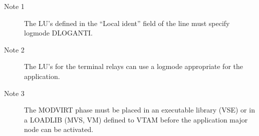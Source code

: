 \documentclass[letterpaper,10pt,english]{sphinxmanual}
\begin{document}
\begin{sphinxVerbatim}[commandchars=\\\{\}]
           
  
  
  
  
  
\end{sphinxVerbatim}

\begin{description}
\item[{Note 1}] \leavevmode
The LU’s defined in the “Local ident” field of the line must specify logmode DLOGANTI.

\item[{Note 2}] \leavevmode
The LU’s for the terminal relays can use a logmode appropriate for the application.

\item[{Note 3}] \leavevmode
The MODVIRT phase must be placed in an executable library (VSE) or in a LOADLIB (MVS, VM) defined to VTAM before the application major node can be activated.

\end{description}
\end{document}
